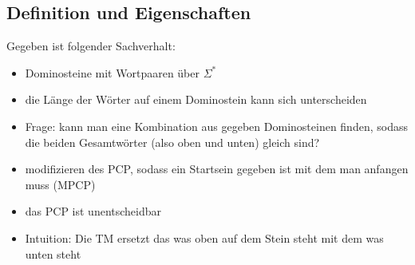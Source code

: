 \documentclass[12pt,a4paper]{article}
\begin{document}
\subsection{Definition und Eigenschaften}
Gegeben ist folgender Sachverhalt:
\begin{itemize}
\item Dominosteine mit Wortpaaren über $\Sigma^*$
\item die Länge der Wörter auf einem Dominostein kann sich unterscheiden
\item Frage: kann man eine Kombination aus gegeben Dominosteinen finden, sodass die beiden Gesamtwörter (also oben und unten) gleich sind?
\item modifizieren des PCP, sodass ein Startsein gegeben ist mit dem man anfangen muss (MPCP)
\item das PCP ist unentscheidbar
\item Intuition: Die TM ersetzt das was oben auf dem Stein steht mit dem was unten steht 
\end{itemize}
\end{document}
